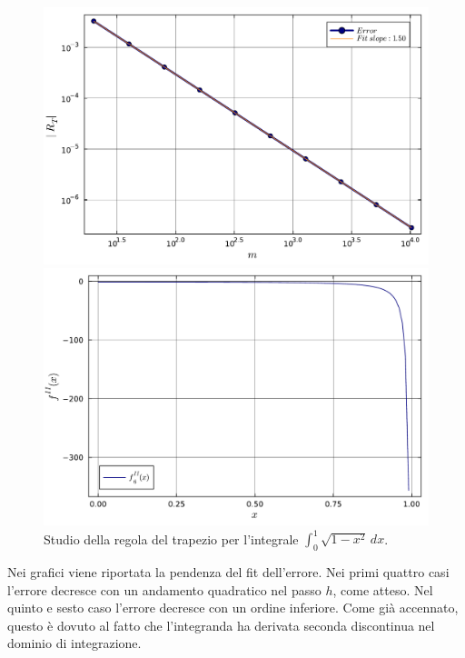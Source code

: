 \documentclass[letterpaper, 12pt]{article}
\numberwithin{equation}{section}    %
\begin{document}
\begin{figure}[!ht]
    \centering
    \begin{minipage}[b]{0.47\textwidth}
        \includegraphics[width=\textwidth]{5126.pdf}
    \end{minipage}
    \hspace{0.5cm}
    \begin{minipage}[b]{0.47\textwidth}
        \includegraphics[width=\textwidth]{5126_2.pdf}
    \end{minipage}
    \caption{Studio della regola del trapezio per l'integrale $\int_0^1 \sqrt{1-x^2}\, dx$.}
    \label{fig:es5_1_2_6}
\end{figure}

Nei grafici viene riportata la pendenza del fit dell'errore. Nei primi quattro casi l'errore 
decresce con un andamento quadratico nel passo $h$, come atteso. Nel quinto e sesto caso l'errore decresce 
con un ordine inferiore. Come già accennato, questo è dovuto al fatto che l'integranda ha derivata seconda 
discontinua nel dominio di integrazione.
\end{document}
